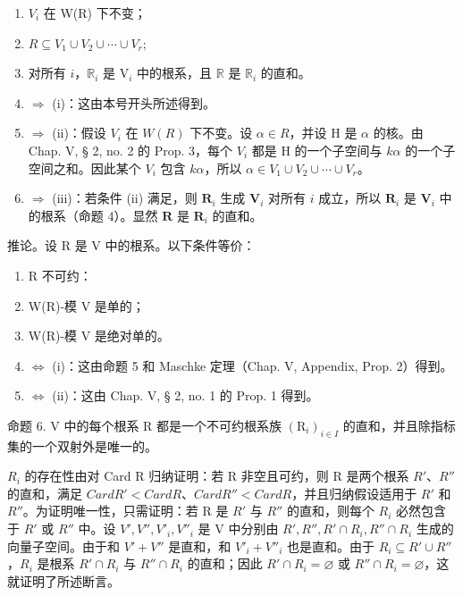 \begin{enumerate}
\def\labelenumi{(\roman{enumi})}
\item
  \(V_{i}\) 在 W(R) 下不变；
\item
  \(R \subseteq V_{1} \cup V_{2} \cup \cdots \cup V_{r};\)
\item
  对所有 \(i\)，\(\mathbb{R}_i\) 是 \(\mathrm{V}_i\) 中的根系，且 \(\mathbb{R}\) 是 \(\mathbb{R}_i\) 的直和。
\item
  \(\Longrightarrow\) (i)：这由本号开头所述得到。
\item
  \(\Longrightarrow\) (ii)：假设 \(V_{i}\) 在 \(W(R)\) 下不变。设 \(\alpha \in R\)，并设 H 是 \(\alpha\) 的核。由 Chap. V, § 2, no. 2 的 Prop. 3，每个 \(V_{i}\) 都是 H 的一个子空间与 \(k\alpha\) 的一个子空间之和。因此某个 \(V_{i}\) 包含 \(k\alpha\)，所以 \(\alpha \in V_{1} \cup V_{2} \cup \cdots \cup V_{r}\)。
\item
  \(\Longrightarrow\) (iii)：若条件 (ii) 满足，则 \(\mathbf{R}_i\) 生成 \(\mathbf{V}_i\) 对所有 \(i\) 成立，所以 \(\mathbf{R}_i\) 是 \(\mathbf{V}_i\) 中的根系（命题 4）。显然 \(\mathbf{R}\) 是 \(\mathbf{R}_i\) 的直和。
\end{enumerate}

推论。设 R 是 V 中的根系。以下条件等价：

\begin{enumerate}
\def\labelenumi{(\roman{enumi})}
\item
  R 不可约：
\item
  W(R)-模 V 是单的；
\item
  W(R)-模 V 是绝对单的。
\item
  \(\Longleftrightarrow\) (i)：这由命题 5 和 Maschke 定理（Chap. V, Appendix, Prop. 2）得到。
\item
  \(\Longleftrightarrow\) (ii)：这由 Chap. V, § 2, no. 1 的 Prop. 1 得到。
\end{enumerate}

命题 6. V 中的每个根系 R 都是一个不可约根系族 \((\mathrm{R}_{i})_{i\in I}\) 的直和，并且除指标集的一个双射外是唯一的。

\(R_{i}\) 的存在性由对 Card R 归纳证明：若 R 非空且可约，则 R 是两个根系 \(R'\)、\(R''\) 的直和，满足 \(Card R' < Card R\)、\(Card R'' < Card R\)，并且归纳假设适用于 \(R'\) 和 \(R''\)。为证明唯一性，只需证明：若 R 是 \(R'\) 与 \(R''\) 的直和，则每个 \(R_i\) 必然包含于 \(R'\) 或 \(R''\) 中。设 \(V', V'', V'_i, V''_i\) 是 V 中分别由 \(R', R'', R' \cap R_i, R'' \cap R_i\) 生成的向量子空间。由于和 \(V' + V''\) 是直和，和 \(V'_i + V''_i\) 也是直和。由于 \(R_i \subseteq R' \cup R''\)，\(R_i\) 是根系 \(R' \cap R_i\) 与 \(R'' \cap R_i\) 的直和；因此 \(R' \cap R_i = \varnothing\) 或 \(R'' \cap R_i = \varnothing\)，这就证明了所述断言。

